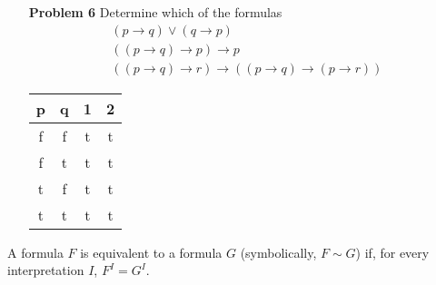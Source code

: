 \documentclass[12pt]{article}
\begin{document}
\begin{enumerate}
\item[\textbf{Problem 6}] Determine which of the formulas 
\begin{gather*}
(p \rightarrow q) \vee  (q \rightarrow p) \\
((p \rightarrow q) \rightarrow  p) \rightarrow p \\
((p \rightarrow q) \rightarrow r) \rightarrow  ((p \rightarrow q) \rightarrow (p \rightarrow r ))  
\end{gather*}
    
\begin{table}[H]
\begin{center}
    \begin{tabular}{c c c c}
    \hline
    p & q & 1 & 2 \\ \hline
    f & f & t   & t   \\
    f & t & t   & t   \\
    t & f & t   & t   \\
    t & t & t   & t   \\ \hline
    \end{tabular}
\end{center}
\end{table}

\end{enumerate}
A formula $F$ is equivalent to a formula $G$ (symbolically, $F \sim G$) if, for every interpretation $I$, $F^I = G^I$. 
\end{document}
